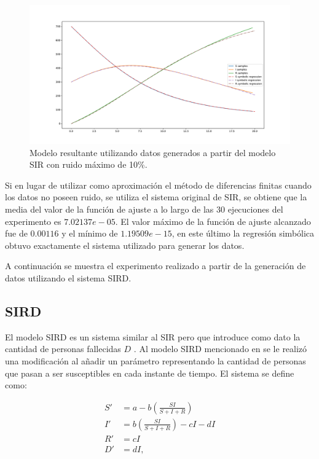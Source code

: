 \begin{figure}[h]
    \centering
    \includegraphics[width=\textwidth]{"figures/final_plot_SIR_0.1.pdf"}
    \caption{Modelo resultante utilizando datos generados a partir del modelo SIR con ruido máximo de 10\%.}
    \label{fig:final_plot_SIR_0.1}
\end{figure}

Si en lugar de utilizar como aproximación el método de diferencias finitas cuando los datos no poseen ruido, se utiliza el sistema original de SIR, se obtiene que la media del valor de la función de ajuste a lo largo de las 30 ejecuciones del experimento es $7.02137e-05$. El valor máximo de la función de ajuste alcanzado fue de $ 0.00116$ y el mínimo de $1.19509e-15$, en este último la regresión simbólica obtuvo exactamente el sistema utilizado para generar los datos.

A continuación se muestra el experimento realizado a partir de la generación de datos utilizando el sistema SIRD.

\subsection{SIRD}

El modelo SIRD es un sistema similar al SIR pero que introduce como dato la cantidad de personas fallecidas $D$ \cite{bailey1975mathematical}. Al modelo SIRD mencionado en \cite{bailey1975mathematical} se le realizó una modificación al añadir un parámetro representando la cantidad de personas que pasan a ser susceptibles en cada instante de tiempo. El sistema se define como:

\begin{align*}
    S' & = a - b (\frac{S I}{S + I + R})         \\
    I' & = b (\frac{S I}{S + I + R}) - c I - d I \\
    R' & = c I                                   \\
    D' & = d I,
\end{align*}

